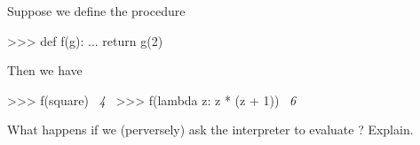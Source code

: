 \begin{exerciseGroup}
\label{Exercise 1.34}
 Suppose we define the procedure

\begin{codeBlock}
>>> def f(g):
...     return g(2)
\end{codeBlock}

Then we have

\begin{codeBlock}
>>> f(square)
~\textit{4}~
>>> f(lambda z: z * (z + 1))
~\textit{6}~
\end{codeBlock}

What happens if we (perversely) ask the interpreter to evaluate
?  Explain.
\end{exerciseGroup}

